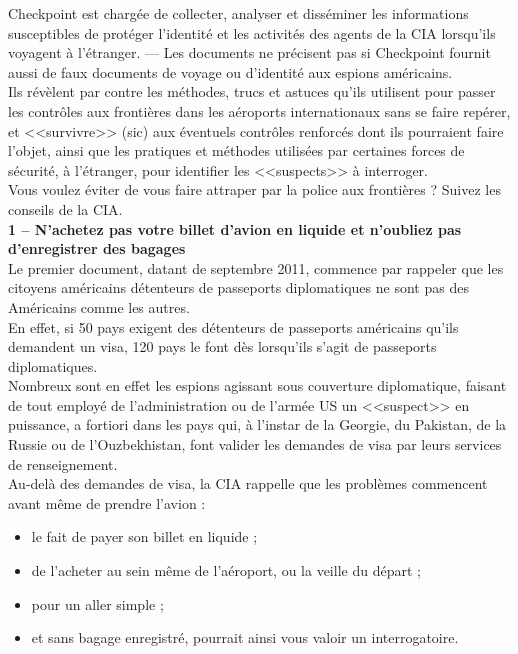 \documentclass[11pt,twoside,a4paper]{article}
\begin{document}
Checkpoint est charg{\'e}e de collecter, analyser et diss{\'e}miner les informations susceptibles de prot{\'e}ger l'identit{\'e} et les activit{\'e}s des agents de la CIA lorsqu'ils voyagent {\`a} l'{\'e}tranger. --- Les documents ne pr{\'e}cisent pas si Checkpoint fournit aussi de faux documents de voyage ou d'identit{\'e} aux espions am{\'e}ricains. ~\\

Ils r{\'e}v{\`e}lent par contre les m{\'e}thodes, trucs et astuces qu'ils utilisent pour passer les contr{\^o}les aux fronti{\`e}res dans les a{\'e}roports internationaux sans se faire rep{\'e}rer, et <<survivre>> (sic) aux {\'e}ventuels contr{\^o}les renforc{\'e}s dont ils pourraient faire l'objet, ainsi que les pratiques et m{\'e}thodes utilis{\'e}es par certaines forces de s{\'e}curit{\'e}, {\`a} l'{\'e}tranger, pour identifier les <<suspects>> {\`a} interroger. ~\\

Vous voulez {\'e}viter de vous faire attraper par la police aux fronti{\`e}res ? Suivez les conseils de la CIA. ~\\

\textbf{\large 1 -- N'achetez pas votre billet d'avion en liquide et n'oubliez pas d'enregistrer des bagages}~\\

Le premier document, datant de septembre 2011, commence par rappeler que les citoyens am{\'e}ricains d{\'e}tenteurs de passeports diplomatiques ne sont pas des Am{\'e}ricains comme les autres. ~\\

En effet, si 50 pays exigent des d{\'e}tenteurs de passeports am{\'e}ricains qu'ils demandent un visa, 120 pays le font d{\`e}s lorsqu'ils s'agit de passeports diplomatiques. ~\\

Nombreux sont en effet les espions agissant sous couverture diplomatique, faisant de tout employ{\'e} de l'administration ou de l'arm{\'e}e US un <<suspect>> en puissance, a fortiori dans les pays qui, {\`a} l'instar de la Georgie, du Pakistan, de la Russie ou de l'Ouzbekhistan, font valider les demandes de visa par leurs services de renseignement. ~\\

Au-del{\`a} des demandes de visa, la CIA rappelle que les probl{\`e}mes commencent avant m{\^e}me de prendre l'avion :
\begin{itemize}
	\item le fait de payer son billet en liquide ;
	\item de l'acheter au sein m{\^e}me de l'a{\'e}roport, ou la veille du d{\'e}part ;
	\item pour un aller simple ;
	\item et sans bagage enregistr{\'e}, pourrait ainsi vous valoir un interrogatoire.
\end{itemize}
\end{document}
